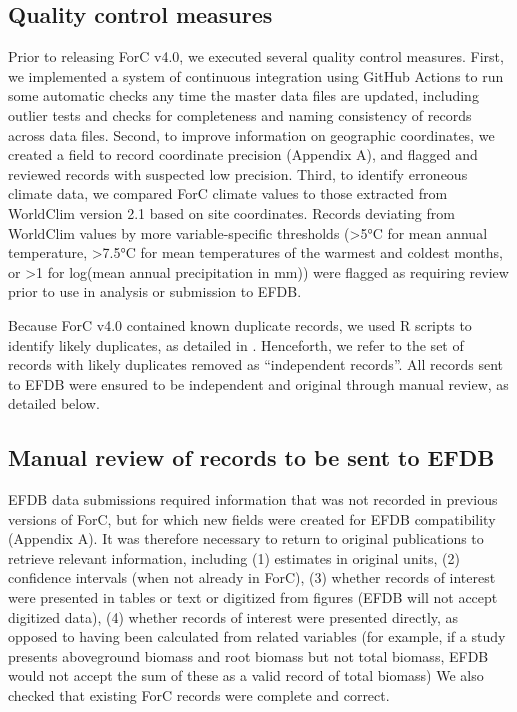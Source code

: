 \documentclass[, manuscript]{copernicus}
\begin{document}
\subsection{Quality control measures}

Prior to releasing ForC v4.0, we executed several quality control
measures. First, we implemented a system of continuous integration using
GitHub Actions \citep[\emph{sensu}][]{kim_implementing_2022} to run some
automatic checks any time the master data files are updated, including
outlier tests and checks for completeness and naming consistency of
records across data files. Second, to improve information on geographic
coordinates, we created a field to record coordinate precision (Appendix
A), and flagged and reviewed records with suspected low precision.
Third, to identify erroneous climate data, we compared ForC climate
values to those extracted from WorldClim version 2.1
\citep{vandepol_identifying_2016, bailey_climwin_2016} based on site
coordinates. Records deviating from WorldClim values by more
variable-specific thresholds (\textgreater5°C for mean annual
temperature, \textgreater7.5°C for mean temperatures of the warmest and
coldest months, or \textgreater1 for log(mean annual precipitation in
mm)) were flagged as requiring review prior to use in analysis or
submission to EFDB.

Because ForC v4.0 contained known duplicate records, we used R scripts
to identify likely duplicates, as detailed in
\citet{anderson-teixeira_carbon_2021}. Henceforth, we refer to the set
of records with likely duplicates removed as ``independent records''.
All records sent to EFDB were ensured to be independent and original
through manual review, as detailed below.

\subsection{Manual review of records to be sent to EFDB}

EFDB data submissions required information that was not recorded in
previous versions of ForC, but for which new fields were created for
EFDB compatibility (Appendix A). It was therefore necessary to return to
original publications to retrieve relevant information, including (1)
estimates in original units, (2) confidence intervals (when not already
in ForC), (3) whether records of interest were presented in tables or
text or digitized from figures (EFDB will not accept digitized data),
(4) whether records of interest were presented directly, as opposed to
having been calculated from related variables (for example, if a study
presents aboveground biomass and root biomass but not total biomass,
EFDB would not accept the sum of these as a valid record of total
biomass) We also checked that existing ForC records were complete and
correct.
\end{document}
